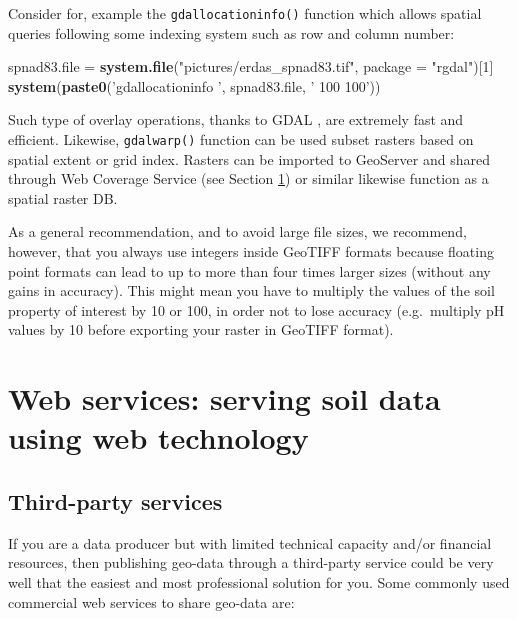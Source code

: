 \documentclass[10pt,b5paper,]{book}
\newenvironment{Shaded}{\begin{snugshade}}{\end{snugshade}}
\newcommand{\DataTypeTok}[1]{\textcolor[rgb]{0.13,0.29,0.53}{#1}}
\newcommand{\DecValTok}[1]{\textcolor[rgb]{0.00,0.00,0.81}{#1}}
\newcommand{\KeywordTok}[1]{\textcolor[rgb]{0.13,0.29,0.53}{\textbf{#1}}}
\newcommand{\NormalTok}[1]{#1}
\newcommand{\StringTok}[1]{\textcolor[rgb]{0.31,0.60,0.02}{#1}}
\theoremstyle{definition}
\theoremstyle{definition}
\theoremstyle{definition}
\theoremstyle{remark}
\begin{document}
Consider for, example the \texttt{gdallocationinfo()} function which
allows spatial queries following some indexing system such as row and
column number:

\begin{Shaded}
\begin{Highlighting}[]
\NormalTok{spnad83.file =}\StringTok{ }\KeywordTok{system.file}\NormalTok{(}\StringTok{"pictures/erdas_spnad83.tif"}\NormalTok{, }
                           \DataTypeTok{package =} \StringTok{"rgdal"}\NormalTok{)[}\DecValTok{1}\NormalTok{]}
\KeywordTok{system}\NormalTok{(}\KeywordTok{paste0}\NormalTok{(}\StringTok{'gdallocationinfo '}\NormalTok{, spnad83.file, }\StringTok{' 100 100'}\NormalTok{))}
\end{Highlighting}
\end{Shaded}

Such type of overlay operations, thanks to GDAL
\citep{warmerdam_geospatial_2008}, are extremely fast and efficient.
Likewise, \texttt{gdalwarp()} function can be used subset rasters based
on spatial extent or grid index. Rasters can be imported to GeoServer
and shared through Web Coverage Service (see Section \ref{webService})
or similar likewise function as a spatial raster DB.

As a general recommendation, and to avoid large file sizes, we
recommend, however, that you always use integers inside GeoTIFF formats
because floating point formats can lead to up to more than four times
larger sizes (without any gains in accuracy). This might mean you have
to multiply the values of the soil property of interest by 10 or 100, in
order not to lose accuracy (e.g.~multiply pH values by 10 before
exporting your raster in GeoTIFF format).

\hypertarget{webService}{%
\section{Web services: serving soil data using web
technology}\label{webService}}

\hypertarget{third-party-services}{%
\subsection{Third-party services}\label{third-party-services}}

If you are a data producer but with limited technical capacity and/or
financial resources, then publishing geo-data through a third-party
service could be very well that the easiest and most professional
solution for you. Some commonly used commercial web services to share
geo-data are:
\end{document}
